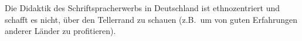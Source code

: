 Die Didaktik des Schriftspracherwerbs in Deutschland ist ethnozentriert und schafft es nicht, über den Tellerrand zu schauen (z.B.\ um von guten Erfahrungen anderer Länder zu profitieren).